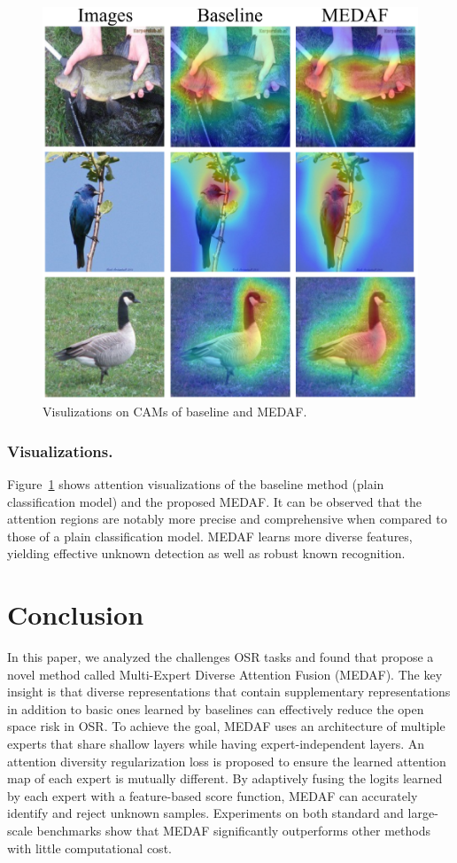 \documentclass[letterpaper]{article} %
\begin{document}
\begin{figure}[t]
  \begin{center}
    \includegraphics[width=0.7\linewidth]{Figs/Fig_cam.pdf}
    \caption{Visulizations on CAMs of baseline and MEDAF.}
    \label{fig:Fig_cam}
    \end{center}
\end{figure}
\subsubsection{Visualizations.}
Figure~\ref{fig:Fig_cam} shows attention visualizations of the baseline method (plain classification model) and the proposed MEDAF. It can be observed that the attention regions are notably more precise and comprehensive when compared to those of a plain classification model. MEDAF learns more diverse features, yielding effective unknown detection as well as robust known recognition.

\section{Conclusion}
In this paper, we analyzed the challenges OSR tasks and found that propose a novel method called Multi-Expert Diverse Attention Fusion (MEDAF). The key insight is that diverse representations that contain supplementary representations in addition to basic ones learned by baselines can effectively reduce the open space risk in OSR. To achieve the goal, MEDAF uses an architecture of multiple experts that share shallow layers while having expert-independent layers. An attention diversity regularization loss is proposed to ensure the learned attention map of each expert is mutually different. By adaptively fusing the logits learned by each expert with a feature-based score function, MEDAF can accurately identify and reject unknown samples. Experiments on both standard and large-scale benchmarks show that MEDAF significantly outperforms other methods with little computational cost. 


\end{document}
